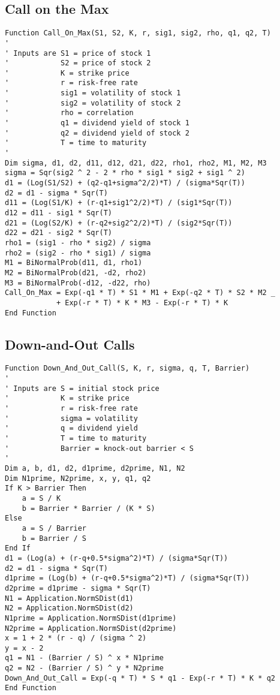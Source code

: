\subsection*{Call on the Max}

\small\begin{verbatim}
Function Call_On_Max(S1, S2, K, r, sig1, sig2, rho, q1, q2, T)
'
' Inputs are S1 = price of stock 1
'            S2 = price of stock 2
'            K = strike price
'            r = risk-free rate
'            sig1 = volatility of stock 1
'            sig2 = volatility of stock 2
'            rho = correlation
'            q1 = dividend yield of stock 1
'            q2 = dividend yield of stock 2
'            T = time to maturity
'
Dim sigma, d1, d2, d11, d12, d21, d22, rho1, rho2, M1, M2, M3
sigma = Sqr(sig2 ^ 2 - 2 * rho * sig1 * sig2 + sig1 ^ 2)
d1 = (Log(S1/S2) + (q2-q1+sigma^2/2)*T) / (sigma*Sqr(T))
d2 = d1 - sigma * Sqr(T)
d11 = (Log(S1/K) + (r-q1+sig1^2/2)*T) / (sig1*Sqr(T))
d12 = d11 - sig1 * Sqr(T)
d21 = (Log(S2/K) + (r-q2+sig2^2/2)*T) / (sig2*Sqr(T))
d22 = d21 - sig2 * Sqr(T)
rho1 = (sig1 - rho * sig2) / sigma
rho2 = (sig2 - rho * sig1) / sigma
M1 = BiNormalProb(d11, d1, rho1)
M2 = BiNormalProb(d21, -d2, rho2)
M3 = BiNormalProb(-d12, -d22, rho)
Call_On_Max = Exp(-q1 * T) * S1 * M1 + Exp(-q2 * T) * S2 * M2 _
            + Exp(-r * T) * K * M3 - Exp(-r * T) * K
End Function
\end{verbatim}\normalsize

\vfil\eject
\subsection*{Down-and-Out Calls}

\small\begin{verbatim}
Function Down_And_Out_Call(S, K, r, sigma, q, T, Barrier)
'
' Inputs are S = initial stock price
'            K = strike price
'            r = risk-free rate
'            sigma = volatility
'            q = dividend yield
'            T = time to maturity
'            Barrier = knock-out barrier < S
'
Dim a, b, d1, d2, d1prime, d2prime, N1, N2
Dim N1prime, N2prime, x, y, q1, q2
If K > Barrier Then
    a = S / K
    b = Barrier * Barrier / (K * S)
Else
    a = S / Barrier
    b = Barrier / S
End If
d1 = (Log(a) + (r-q+0.5*sigma^2)*T) / (sigma*Sqr(T))
d2 = d1 - sigma * Sqr(T)
d1prime = (Log(b) + (r-q+0.5*sigma^2)*T) / (sigma*Sqr(T))
d2prime = d1prime - sigma * Sqr(T)
N1 = Application.NormSDist(d1)
N2 = Application.NormSDist(d2)
N1prime = Application.NormSDist(d1prime)
N2prime = Application.NormSDist(d2prime)
x = 1 + 2 * (r - q) / (sigma ^ 2)
y = x - 2
q1 = N1 - (Barrier / S) ^ x * N1prime
q2 = N2 - (Barrier / S) ^ y * N2prime
Down_And_Out_Call = Exp(-q * T) * S * q1 - Exp(-r * T) * K * q2
End Function
\end{verbatim}\normalsize

